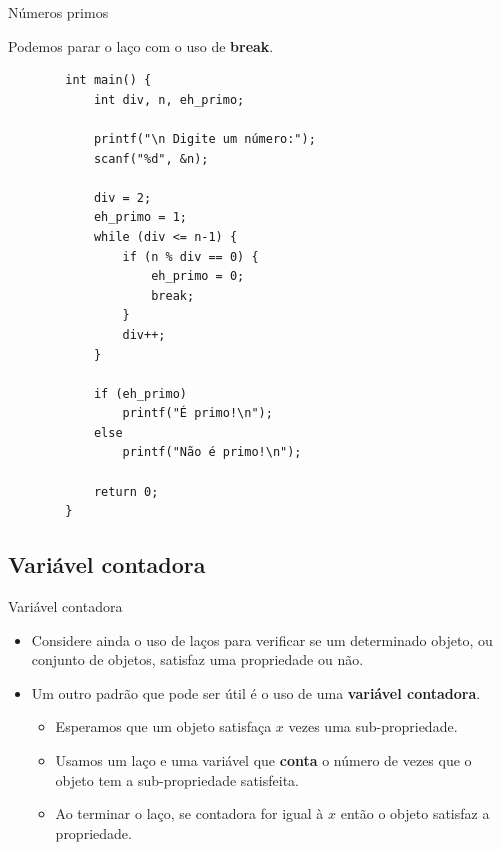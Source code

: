 \documentclass[handout]{beamer}
\begin{document}
\begin{frame}[fragile]{Números primos}
    
    Podemos parar o laço com o uso de {\bf break}.

    \begin{verbatim}
        int main() {
            int div, n, eh_primo;

            printf("\n Digite um número:");
            scanf("%d", &n);

            div = 2;
            eh_primo = 1;
            while (div <= n-1) {
                if (n % div == 0) {
                    eh_primo = 0;
                    break;
                }
                div++;
            }
            
            if (eh_primo)
                printf("É primo!\n");
            else
                printf("Não é primo!\n");

            return 0;
        }
    \end{verbatim}
\end{frame}

\subsection{Variável contadora}%

\begin{frame}{Variável contadora}

    \begin{itemize}[<+->]
        \item Considere ainda o uso de laços para verificar se um determinado objeto, ou conjunto de objetos, satisfaz uma propriedade ou não.
        \item Um outro padrão que pode ser útil é o uso de uma {\bf variável contadora}.
        \begin{itemize}
            \item Esperamos que um objeto satisfaça $x$ vezes uma sub-propriedade.
            \item Usamos um laço e uma variável que {\bf conta} o número de vezes que o objeto tem a sub-propriedade satisfeita.
            \item Ao terminar o laço, se contadora for igual à $x$ então o objeto satisfaz a propriedade.
        \end{itemize}
    \end{itemize}
\end{frame}
\end{document}
